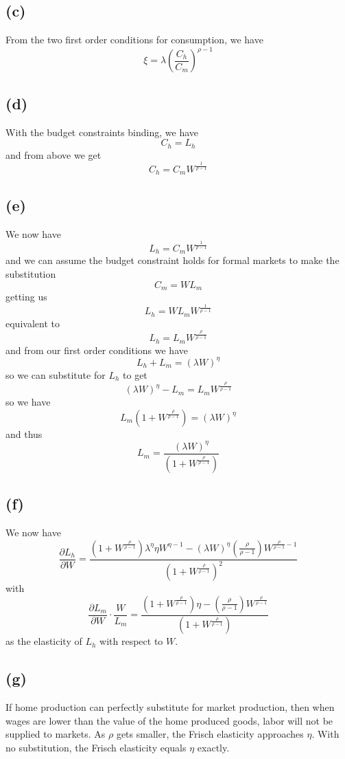 \documentclass[11pt]{amsart}
\begin{document}
\subsection*{(c)}

From the two first order conditions for consumption, we have
\[
\xi = \lambda \left( \frac{C_h}{C_m} \right)^{\rho-1}
\]

\subsection*{(d)}

With the budget constraints binding, we have
\[
C_h = L_h
\]
and from above we get
\[
C_h = C_m W^{\frac{1}{\rho-1}}
\]

\subsection*{(e)}

We now have
\[
L_h = C_m W^{\frac{1}{\rho-1}}
\]
and we can assume the budget constraint holds for formal markets to make the substitution
\[
C_m = WL_m
\]
getting us
\[
L_h = WL_m W^{\frac{1}{\rho-1}}
\]
equivalent to
\[
L_h = L_m W^{\frac{\rho}{\rho-1}}
\]
and from our first order conditions we have
\[
L_h + L_m = (\lambda W)^{\eta}
\]
so we can substitute for $L_h$ to get
\[
(\lambda W)^{\eta} - L_m = L_m W^{\frac{\rho}{\rho-1}}
\]
so we have
\[
L_m (1 + W^{\frac{\rho}{\rho-1}}) = (\lambda W)^{\eta}
\]
and thus
\[
L_m = \frac{(\lambda W)^{\eta}}{(1 + W^{\frac{\rho}{\rho-1}})}
\]

\subsection*{(f)}

We now have
\[
\frac{\partial L_h}{\partial W} = \frac{(1 + W^{\frac{\rho}{\rho-1}}) \lambda^{\eta} \eta W^{\eta - 1} - (\lambda W)^{\eta} (\frac{\rho}{\rho-1}) W^{\frac{\rho}{\rho-1} - 1}}{(1 + W^{\frac{\rho}{\rho-1}})^2}
\]
with 
\[
\frac{\partial L_m}{\partial W} \cdot \frac{W}{L_m} = \frac{(1 + W^{\frac{\rho}{\rho-1}}) \eta  -  (\frac{\rho}{\rho-1}) W^{\frac{\rho}{\rho-1}}}{(1 + W^{\frac{\rho}{\rho-1}})}
\]
as the elasticity of $L_h$ with respect to $W$.

\subsection*{(g)}

If home production can perfectly substitute for market production, then when wages are lower than the value of the home produced goods, labor will not be supplied to markets. 
As $\rho$ gets smaller, the Frisch elasticity approaches $\eta$. 
With no substitution, the Frisch elasticity equals $\eta$ exactly. 
	
\end{document}
